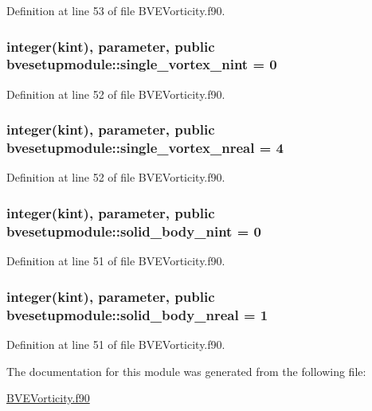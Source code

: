 Definition at line 53 of file B\+V\+E\+Vorticity.\+f90.

\hypertarget{classbvesetupmodule_a2c58eb453402e67be55a8905f15297b1}{
\subsubsection[{single\+\_\+vortex\+\_\+nint}]{\setlength{\rightskip}{0pt plus 5cm}integer(kint), parameter, public bvesetupmodule\+::single\+\_\+vortex\+\_\+nint = 0}}\label{classbvesetupmodule_a2c58eb453402e67be55a8905f15297b1}


Definition at line 52 of file B\+V\+E\+Vorticity.\+f90.

\hypertarget{classbvesetupmodule_a9de664dad47768064654ff03a0fa2a8b}{
\subsubsection[{single\+\_\+vortex\+\_\+nreal}]{\setlength{\rightskip}{0pt plus 5cm}integer(kint), parameter, public bvesetupmodule\+::single\+\_\+vortex\+\_\+nreal = 4}}\label{classbvesetupmodule_a9de664dad47768064654ff03a0fa2a8b}


Definition at line 52 of file B\+V\+E\+Vorticity.\+f90.

\hypertarget{classbvesetupmodule_a6e22885111c69676713eeea3ed98b527}{
\subsubsection[{solid\+\_\+body\+\_\+nint}]{\setlength{\rightskip}{0pt plus 5cm}integer(kint), parameter, public bvesetupmodule\+::solid\+\_\+body\+\_\+nint = 0}}\label{classbvesetupmodule_a6e22885111c69676713eeea3ed98b527}


Definition at line 51 of file B\+V\+E\+Vorticity.\+f90.

\hypertarget{classbvesetupmodule_acc77359b288c51041c167b38af335774}{
\subsubsection[{solid\+\_\+body\+\_\+nreal}]{\setlength{\rightskip}{0pt plus 5cm}integer(kint), parameter, public bvesetupmodule\+::solid\+\_\+body\+\_\+nreal = 1}}\label{classbvesetupmodule_acc77359b288c51041c167b38af335774}


Definition at line 51 of file B\+V\+E\+Vorticity.\+f90.



The documentation for this module was generated from the following file\+:\begin{DoxyCompactItemize}
\item 
\hyperlink{BVEVorticity_8f90}{B\+V\+E\+Vorticity.\+f90}\end{DoxyCompactItemize}
